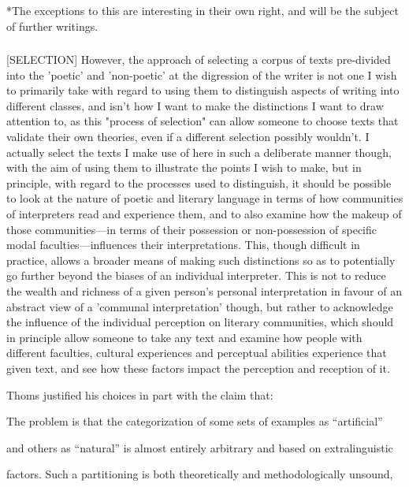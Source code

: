 \documentclass[]{article}
\begin{document}
*The exceptions to this are interesting in their own right, and will be the subject of further writings.



\subsubsection{}



[SELECTION] However, the approach of selecting a corpus of texts pre-divided into the 'poetic' and 'non-poetic' at the digression of the writer is not one I wish to primarily take with regard to using them to distinguish aspects of writing into different classes, and isn't how I want to make the distinctions I want to draw attention to, as this "process of selection" can allow someone to choose texts that validate their own theories, even if a different selection possibly wouldn't. I actually select the texts I make use of here in such a deliberate manner though, with the aim of using them to illustrate the points I wish to make, but in principle, with regard to the processes used to distinguish, it should be possible to look at the nature of poetic and literary language in terms of how communities of interpreters read and experience them, and to also examine how the makeup of those communities—in terms of their possession or non-possession of specific modal faculties—influences their interpretations. This, though difficult in practice, allows a broader means of making such distinctions so as to potentially go further beyond the biases of an individual interpreter. This is not to reduce the wealth and richness of a given person's personal interpretation in favour of an abstract view of a 'communal interpretation' though, but rather to acknowledge the influence of the individual perception on literary communities, which should in principle allow someone to take any text and examine how people with different faculties, cultural experiences and perceptual abilities experience that given text, and see how these factors impact the perception and reception of it.



Thoms justified his choices in part with the claim that:

The problem is that the categorization of some sets of examples as “artificial”

and others as “natural” is almost entirely arbitrary and based on extralinguistic

factors. Such a partitioning is both theoretically and methodologically unsound,
\end{document}
